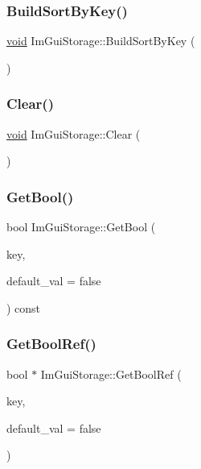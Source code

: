 \subsubsection{\texorpdfstring{Build\+Sort\+By\+Key()}{BuildSortByKey()}}
{\footnotesize\ttfamily \hyperlink{imgui__impl__opengl3__loader_8h_ac668e7cffd9e2e9cfee428b9b2f34fa7}{void} Im\+Gui\+Storage\+::\+Build\+Sort\+By\+Key (\begin{DoxyParamCaption}{ }\end{DoxyParamCaption})}

\mbox{\label{structImGuiStorage_a72ceecfbca3d08df8c2a232b77890c20}} 
\subsubsection{\texorpdfstring{Clear()}{Clear()}}
{\footnotesize\ttfamily \hyperlink{imgui__impl__opengl3__loader_8h_ac668e7cffd9e2e9cfee428b9b2f34fa7}{void} Im\+Gui\+Storage\+::\+Clear (\begin{DoxyParamCaption}{ }\end{DoxyParamCaption})\hspace{0.3cm}{\ttfamily [inline]}}

\mbox{\label{structImGuiStorage_a22d34ae6278f86468a3e7df8fbd1b632}} 
\subsubsection{\texorpdfstring{Get\+Bool()}{GetBool()}}
{\footnotesize\ttfamily bool Im\+Gui\+Storage\+::\+Get\+Bool (\begin{DoxyParamCaption}\item[{Im\+Gui\+ID}]{key,  }\item[{bool}]{default\+\_\+val = {\ttfamily false} }\end{DoxyParamCaption}) const}

\mbox{\label{structImGuiStorage_aeb0d62100453d710bac5f6ad0a6e6a2e}} 
\subsubsection{\texorpdfstring{Get\+Bool\+Ref()}{GetBoolRef()}}
{\footnotesize\ttfamily bool $\ast$ Im\+Gui\+Storage\+::\+Get\+Bool\+Ref (\begin{DoxyParamCaption}\item[{Im\+Gui\+ID}]{key,  }\item[{bool}]{default\+\_\+val = {\ttfamily false} }\end{DoxyParamCaption})}

